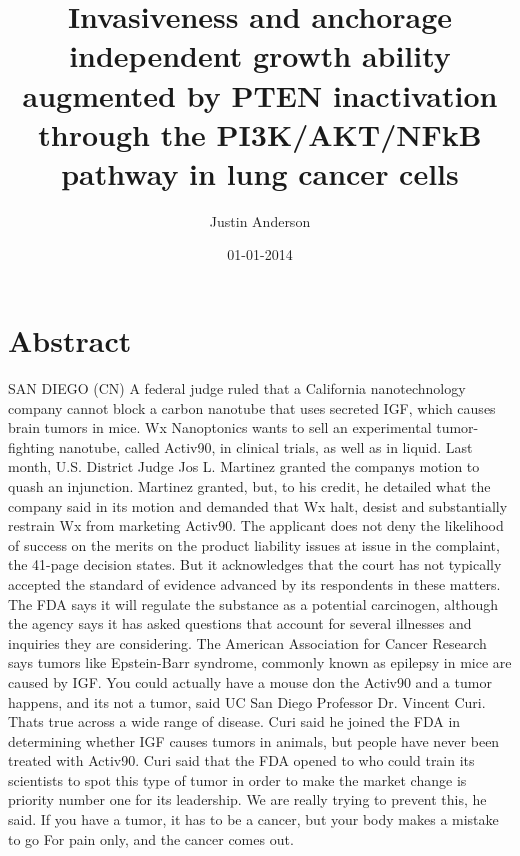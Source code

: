 \documentclass{article}%
\title{Invasiveness and anchorage independent growth ability augmented by PTEN inactivation through the PI3K/AKT/NFkB pathway in lung cancer cells}%
\author{Justin Anderson}%
\affil{Department of Oral Biology and Pathology, School of Dental Medicine, Stony Brook University, Stony Brook, New York, United States of America}%
\date{01{-}01{-}2014}%
\begin{document}
%
\normalsize%
\maketitle%
\section{Abstract}%
\label{sec:Abstract}%
SAN DIEGO (CN)  A federal judge ruled that a California nanotechnology company cannot block a carbon nanotube that uses secreted IGF, which causes brain tumors in mice.\newline%
Wx Nanoptonics wants to sell an experimental tumor{-}fighting nanotube, called Activ90, in clinical trials, as well as in liquid.\newline%
Last month, U.S. District Judge Jos L. Martinez granted the companys motion to quash an injunction.\newline%
Martinez granted, but, to his credit, he detailed what the company said in its motion and demanded that Wx halt, desist and substantially restrain Wx from marketing Activ90.\newline%
The applicant does not deny the likelihood of success on the merits on the product liability issues at issue in the complaint, the 41{-}page decision states. But it acknowledges that the court has not typically accepted the standard of evidence advanced by its respondents in these matters.\newline%
The FDA says it will regulate the substance as a potential carcinogen, although the agency says it has asked questions that account for several illnesses and inquiries they are considering.\newline%
The American Association for Cancer Research says tumors like Epstein{-}Barr syndrome, commonly known as epilepsy in mice are caused by IGF.\newline%
You could actually have a mouse don the Activ90 and a tumor happens, and its not a tumor, said UC San Diego Professor Dr. Vincent Curi. Thats true across a wide range of disease.\newline%
Curi said he joined the FDA in determining whether IGF causes tumors in animals, but people have never been treated with Activ90.\newline%
Curi said that the FDA opened to who could train its scientists to spot this type of tumor in order to make the market change is priority number one for its leadership.\newline%
We are really trying to prevent this, he said. If you have a tumor, it has to be a cancer, but your body makes a mistake to go For pain only, and the cancer comes out.\newline%
\end{document}
